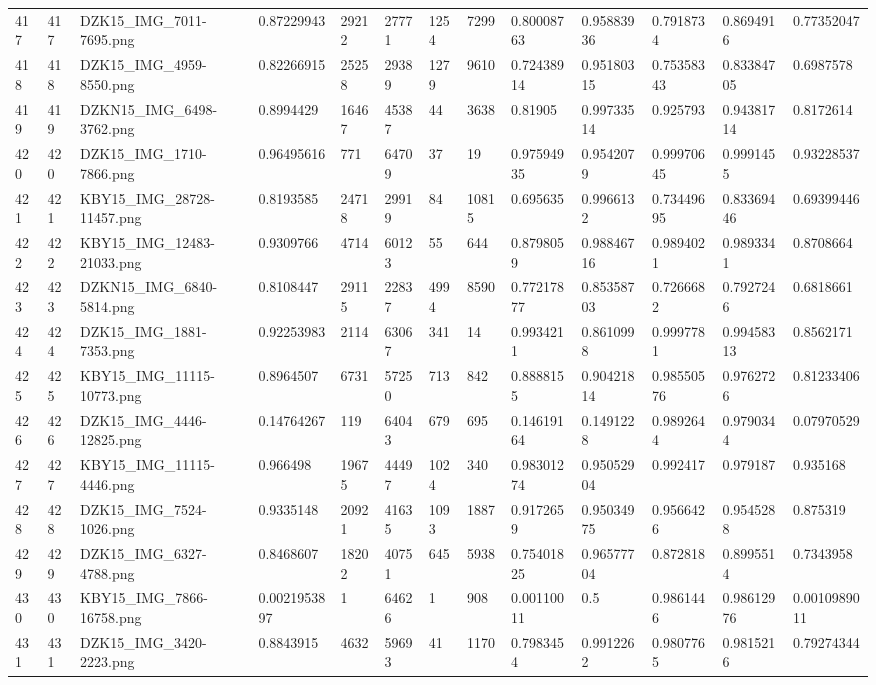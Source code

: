 \documentclass[11pt, a4paper, twoside]{report}
\begin{document}
\begin{longtable}[c]{@{}lllllllllllll@{}}
417 & 417 & DZK15\_IMG\_7011-7695.png & 0.87229943 & 29212 & 27771 & 1254 & 7299 & 0.80008763 & 0.95883936 & 0.7918734 & 0.8694916 & 0.77352047 \\
418 & 418 & DZK15\_IMG\_4959-8550.png & 0.82266915 & 25258 & 29389 & 1279 & 9610 & 0.72438914 & 0.95180315 & 0.75358343 & 0.83384705 & 0.6987578 \\
419 & 419 & DZKN15\_IMG\_6498-3762.png & 0.8994429 & 16467 & 45387 & 44 & 3638 & 0.81905 & 0.99733514 & 0.925793 & 0.94381714 & 0.8172614 \\
420 & 420 & DZK15\_IMG\_1710-7866.png & 0.96495616 & 771 & 64709 & 37 & 19 & 0.97594935 & 0.9542079 & 0.99970645 & 0.9991455 & 0.93228537 \\
421 & 421 & KBY15\_IMG\_28728-11457.png & 0.8193585 & 24718 & 29919 & 84 & 10815 & 0.695635 & 0.9966132 & 0.73449695 & 0.83369446 & 0.69399446 \\
422 & 422 & KBY15\_IMG\_12483-21033.png & 0.9309766 & 4714 & 60123 & 55 & 644 & 0.8798059 & 0.98846716 & 0.9894021 & 0.9893341 & 0.8708664 \\
423 & 423 & DZKN15\_IMG\_6840-5814.png & 0.8108447 & 29115 & 22837 & 4994 & 8590 & 0.77217877 & 0.85358703 & 0.7266682 & 0.7927246 & 0.6818661 \\
424 & 424 & DZK15\_IMG\_1881-7353.png & 0.92253983 & 2114 & 63067 & 341 & 14 & 0.9934211 & 0.8610998 & 0.9997781 & 0.99458313 & 0.8562171 \\
425 & 425 & KBY15\_IMG\_11115-10773.png & 0.8964507 & 6731 & 57250 & 713 & 842 & 0.8888155 & 0.90421814 & 0.98550576 & 0.9762726 & 0.81233406 \\
426 & 426 & DZK15\_IMG\_4446-12825.png & 0.14764267 & 119 & 64043 & 679 & 695 & 0.14619164 & 0.1491228 & 0.9892644 & 0.9790344 & 0.07970529 \\
427 & 427 & KBY15\_IMG\_11115-4446.png & 0.966498 & 19675 & 44497 & 1024 & 340 & 0.98301274 & 0.95052904 & 0.992417 & 0.979187 & 0.935168 \\
428 & 428 & DZK15\_IMG\_7524-1026.png & 0.9335148 & 20921 & 41635 & 1093 & 1887 & 0.9172659 & 0.95034975 & 0.9566426 & 0.9545288 & 0.875319 \\
429 & 429 & DZK15\_IMG\_6327-4788.png & 0.8468607 & 18202 & 40751 & 645 & 5938 & 0.75401825 & 0.96577704 & 0.872818 & 0.8995514 & 0.7343958 \\
430 & 430 & KBY15\_IMG\_7866-16758.png & 0.0021953897 & 1 & 64626 & 1 & 908 & 0.00110011 & 0.5 & 0.9861446 & 0.98612976 & 0.0010989011 \\
431 & 431 & DZK15\_IMG\_3420-2223.png & 0.8843915 & 4632 & 59693 & 41 & 1170 & 0.7983454 & 0.9912262 & 0.9807765 & 0.9815216 & 0.79274344 \\

\end{longtable}
\end{document}
